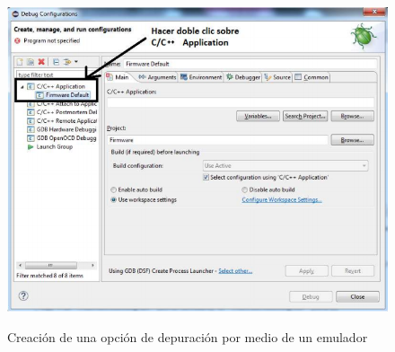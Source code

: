 \documentclass[12pt,letterpaper]{article}
\begin{document}
\begin{center}
\begin{figure}[!h]
\centering
\includegraphics[width=5 cm]{figuras/primer_proy12.png}\\
\caption{Creación de una opción de depuración por medio de un emulador}
\label{primer_proy12}
\end{figure}
\end{center}
\end{document}

